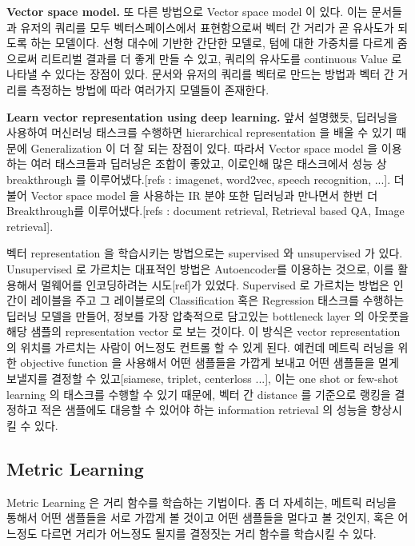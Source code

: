 \textbf{Vector space model.} 또 다른 방법으로 Vector space model 이 있다. 이는 문서들과 유저의 쿼리를 모두 벡터스페이스에서 표현함으로써 벡터 간 거리가 곧 유사도가 되도록 하는 모델이다. 선형 대수에 기반한 간단한 모델로, 텀에 대한 가중치를 다르게 줌으로써 리트리벌 결과를 더 좋게 만들 수 있고, 쿼리의 유사도를 continuous Value 로 나타낼 수 있다는 장점이 있다.\cite{salton1975vector} 문서와 유저의 쿼리를 벡터로 만드는 방법\cite{}과 벡터 간 거리를 측정하는 방법\cite{}에 따라 여러가지 모델들이 존재한다.

\textbf{Learn vector representation using deep learning.} 앞서 설명했듯, 딥러닝을 사용하여 머신러닝 태스크를 수행하면 hierarchical representation 을 배울 수 있기 때문에 Generalization 이 더 잘 되는 장점이 있다. 따라서 Vector space model 을 이용하는 여러 태스크들과 딥러닝은 조합이 좋았고, 이로인해 많은 태스크에서 성능 상 breakthrough 를 이루어냈다.[refs : imagenet, word2vec, speech recognition, ...]. 더불어 Vector space model 을 사용하는 IR 분야 또한 딥러닝과 만나면서 한번 더 Breakthrough를 이루어냈다.[refs : document retrieval, Retrieval based QA, Image retrieval]. 

벡터 representation 을 학습시키는 방법으로는 supervised 와 unsupervised 가 있다. Unsupervised 로 가르치는 대표적인 방법은 Autoencoder를 이용하는 것으로, 이를 활용해서 멀웨어를 인코딩하려는 시도[ref]가 있었다. Supervised 로 가르치는 방법은 인간이 레이블을 주고 그 레이블로의 Classification 혹은 Regression 태스크를 수행하는 딥러닝 모델을 만들어, 정보를 가장 압축적으로 담고있는 bottleneck layer 의 아웃풋을 해당 샘플의 representation vector 로 보는 것이다. 이 방식은 vector representation 의 위치를 가르치는 사람이 어느정도 컨트롤 할 수 있게 된다. 예컨데 메트릭 러닝을 위한 objective function 을 사용해서 어떤 샘플들을 가깝게 보내고 어떤 샘플들을 멀게 보낼지를 결정할 수 있고[siamese, triplet, centerloss ...], 이는 one shot or few-shot learning 의 태스크를 수행할 수 있기 때문에, 벡터 간 distance 를 기준으로 랭킹을 결정하고 적은 샘플에도 대응할 수 있어야 하는 information retrieval 의 성능을 향상시킬 수 있다. 



\subsection{Metric Learning}
Metric Learning 은 거리 함수를 학습하는 기법이다. 좀 더 자세히는, 메트릭 러닝을 통해서 어떤 샘플들을 서로 가깝게 볼 것이고 어떤 샘플들을 멀다고 볼 것인지, 혹은 어느정도 다르면 거리가 어느정도 될지를 결정짓는 거리 함수를 학습시킬 수 있다. 

